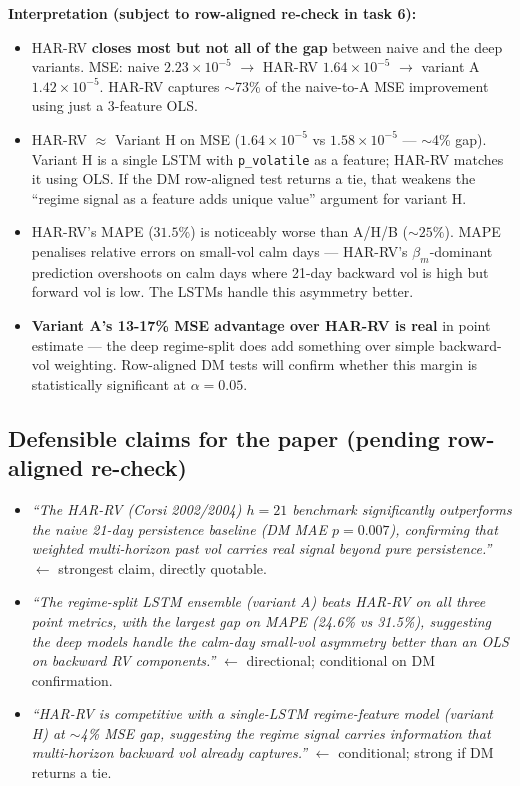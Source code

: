 \documentclass[11pt]{article}
\begin{document}
\textbf{Interpretation (subject to row-aligned re-check in task 6):}

\begin{itemize}[leftmargin=*]
  \item HAR-RV \textbf{closes most but not all of the gap} between naive and the deep variants. MSE: naive $2.23 \times 10^{-5}$ $\to$ HAR-RV $1.64 \times 10^{-5}$ $\to$ variant A $1.42 \times 10^{-5}$. HAR-RV captures $\sim$73\% of the naive-to-A MSE improvement using just a 3-feature OLS.
  \item HAR-RV $\approx$ Variant H on MSE ($1.64 \times 10^{-5}$ vs $1.58 \times 10^{-5}$ --- $\sim$4\% gap). Variant H is a single LSTM with \texttt{p\_volatile} as a feature; HAR-RV matches it using OLS. If the DM row-aligned test returns a tie, that weakens the ``regime signal as a feature adds unique value'' argument for variant H.
  \item HAR-RV's MAPE ($31.5\%$) is noticeably worse than A/H/B ($\sim 25\%$). MAPE penalises relative errors on small-vol calm days --- HAR-RV's $\beta_m$-dominant prediction overshoots on calm days where 21-day backward vol is high but forward vol is low. The LSTMs handle this asymmetry better.
  \item \textbf{Variant A's 13-17\% MSE advantage over HAR-RV is real} in point estimate --- the deep regime-split does add something over simple backward-vol weighting. Row-aligned DM tests will confirm whether this margin is statistically significant at $\alpha = 0.05$.
\end{itemize}

\subsection*{Defensible claims for the paper (pending row-aligned re-check)}

\begin{itemize}[leftmargin=*]
  \item \emph{``The HAR-RV (Corsi 2002/2004) $h = 21$ benchmark significantly outperforms the naive 21-day persistence baseline (DM MAE $p = 0.007$), confirming that weighted multi-horizon past vol carries real signal beyond pure persistence.''} $\leftarrow$ strongest claim, directly quotable.
  \item \emph{``The regime-split LSTM ensemble (variant A) beats HAR-RV on all three point metrics, with the largest gap on MAPE (24.6\% vs 31.5\%), suggesting the deep models handle the calm-day small-vol asymmetry better than an OLS on backward RV components.''} $\leftarrow$ directional; conditional on DM confirmation.
  \item \emph{``HAR-RV is competitive with a single-LSTM regime-feature model (variant H) at $\sim$4\% MSE gap, suggesting the regime signal carries information that multi-horizon backward vol already captures.''} $\leftarrow$ conditional; strong if DM returns a tie.
\end{itemize}
\end{document}
